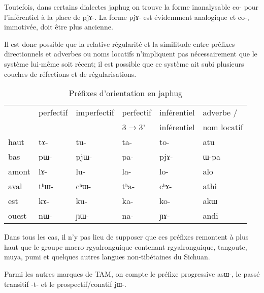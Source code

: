 \documentclass[oldfontcommands,oneside,a4paper,11pt]{article}
\newcommand{\ipa}[1]{{\phon \mbox{#1}}} %
\begin{document}
Toutefois, dans certains dialectes japhug on trouve la forme inanalysable \ipa{co-} pour l'inférentiel à la place de \ipa{pjɤ-}. La forme \ipa{pjɤ-} est évidemment analogique et \ipa{co-}, immotivée, doit être plus ancienne.

Il est donc possible que la relative régularité et la similitude entre préfixes directionnels et adverbes ou noms locatifs n'impliquent pas nécessairement que le système lui-même soit récent; il est possible que ce système ait subi plusieurs couches de réfections et de régularisations. 

\begin{table}[H]
\caption{Préfixes d'orientation en japhug} \label{tab:orientation}
\begin{tabular}{llllll}
\toprule
   &  	perfectif &  	imperfectif  &  	perfectif   &  	inférentiel  & adverbe / \\  	
  &  	  &  	   &  	  3$\rightarrow$3'  &  	inférentiel  & nom locatif\\  	
   \midrule
haut   &  	\ipa{tɤ-}   &  	\ipa{tu-}   &  	\ipa{ta-}   &  	\ipa{to-}  & \ipa{atu} \\  	
bas   &  	\ipa{pɯ-}   &  	\ipa{pjɯ-}   &  	\ipa{pa-}   &  	\ipa{pjɤ-}  &\ipa{ɯ-pa} \\  	
amont   &  	\ipa{lɤ-}   &  	\ipa{lu-}   &  	\ipa{la-}   &  	\ipa{lo-}  & \ipa{alo}  \\  	
aval   &  	\ipa{tʰɯ-}   &  	\ipa{cʰɯ-}   &  	\ipa{tʰa-}   &  	\ipa{cʰɤ-} & \ipa{athi}  \\  	
est   &  	\ipa{kɤ-}   &  	\ipa{ku-}   &  	\ipa{ka-}   &  	\ipa{ko-}  & \ipa{akɯ}  \\  	
ouest   &  	\ipa{nɯ-}   &  	\ipa{ɲɯ-}   &  	\ipa{na-}   &  	\ipa{ɲɤ-}  & \ipa{andi}  \\  	
\bottomrule
\end{tabular} 
\end{table}

Dans tous les cas, il n'y pas lieu de supposer que ces préfixes remontent à plus haut que le groupe macro-rgyalronguique contenant rgyalronguique, tangoute, muya, pumi et quelques autres langues non-tibétaines du Sichuan. 


Parmi les autres marques de TAM, on compte le préfixe progressive \ipa{asɯ-}, le passé transitif \ipa{-t-} et le prospectif/conatif \ipa{jɯ-}. 
\end{document}

